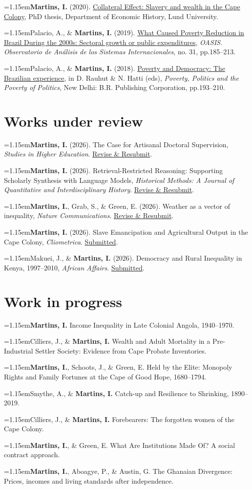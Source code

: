 \documentclass[11pt,a4paper]{article}
\newcommand{\cvlistitem}[1]{\par\addvspace{5pt}\noindent
  \textcolor{accent}{\raisebox{.45ex}{\rule{3.2pt}{3.2pt}}}\hspace{7pt}%
  \begin{minipage}[t]{\dimexpr\linewidth-12pt\relax}\hangindent=1.15em\hangafter=1\relax #1\par\end{minipage}\par}
\let\originalsection\section
\renewcommand{\section}[1]{\par\Needspace{110pt}\originalsection{#1}}
\begin{document}
\smallskip
\cvlistitem{\textbf{Martins, I.} (2020). \href{https://portal.research.lu.se/en/publications/collateral-effect-slavery-and-wealth-in-the-cape-colony}{Collateral Effect: Slavery and wealth in the Cape Colony}, PhD thesis, Department of Economic History, Lund University.}
\smallskip
\cvlistitem{Palacio, A., \& \textbf{Martins, I.} (2019). \href{https://revistas.uexternado.edu.co/index.php/oasis/article/view/6232/8773}{What Caused Poverty Reduction in Brazil During the 2000s: Sectoral growth or public expenditures}, \textit{OASIS. Observatorio de Análisis de los Sistemas Internacionales}, no. 31, pp.185--213.}
\smallskip
\cvlistitem{Palacio, A., \& \textbf{Martins, I.} (2018). \href{https://www.amazon.com/Poverty-Politics/dp/9387587126}{Poverty and Democracy: The Brazilian experience}, in D. Rauhut \& N. Hatti (eds), \textit{Poverty, Politics and the Poverty of Politics}, New Delhi: B.R. Publishing Corporation, pp.193--210.}


\section{Works under review}
\cvlistitem{\textbf{Martins, I.} (2026). The Case for Artisanal Doctoral Supervision, \textit{Studies in Higher Education}. \underline{Revise \& Resubmit}.}
\smallskip
\cvlistitem{\textbf{Martins, I.} (2026). Retrieval-Restricted Reasoning: Supporting Scholarly Synthesis with Language Models, \textit{Historical Methods: A Journal of Quantitative and Interdisciplinary History}. \underline{Revise \& Resubmit}.}
\smallskip
\cvlistitem{\textbf{Martins, I.}, Grab, S., \& Green, E. (2026). Weather as a vector of inequality, \textit{Nature Communications}. \underline{Revise \& Resubmit}.}
\smallskip
\cvlistitem{\textbf{Martins, I.} (2026). Slave Emancipation and Agricultural Output in the Cape Colony, \textit{Cliometrica}. \underline{Submitted}.}
\smallskip
\cvlistitem{Makuei, J., \& \textbf{Martins, I.} (2026). Democracy and Rural Inequality in Kenya, 1997--2010, \textit{African Affairs}. \underline{Submitted}.}


\section{Work in progress}
\cvlistitem{\textbf{Martins, I.} Income Inequality in Late Colonial Angola, 1940--1970.}
\smallskip
\cvlistitem{Cilliers, J., \& \textbf{Martins, I.} Wealth and Adult Mortality in a Pre-Industrial Settler Society: Evidence from Cape Probate Inventories.}
\smallskip
\cvlistitem{\textbf{Martins, I.}, Schoots, J., \& Green, E. Held by the Elite: Monopoly Rights and Family Fortunes at the Cape of Good Hope, 1680--1794.}
\smallskip
\cvlistitem{Smythe, A., \& \textbf{Martins, I.} Catch-up and Resilience to Shrinking, 1890--2019.}
\smallskip
\cvlistitem{Cilliers, J., \& \textbf{Martins, I.} Forebearers: The forgotten women of the Cape Colony.}
\smallskip
\cvlistitem{\textbf{Martins, I.}, \& Green, E. What Are Institutions Made Of? A social contract approach.}
\smallskip
\cvlistitem{\textbf{Martins, I.}, Aboagye, P., \& Austin, G. The Ghanaian Divergence: Prices, incomes and living standards after independence.}
\end{document}
